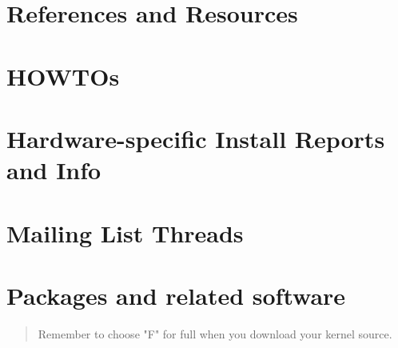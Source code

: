 \section{References and Resources}\label{bibliography}

\section{HOWTOs}\label{ref-howto}

\href{URL}{}

\href{URL 2}{}

\section{Hardware-specific Install Reports and
Info}\label{ref-installreports}

\href{URL 3}{}

\href{URL 4}{}

\section{Mailing List Threads}\label{ref-mailinglist}

\href{URL 5}{}

\section{Packages and related software}\label{ref-software}

\href{http://www.kernel.org}{}

\begin{quote}
Remember to choose "F" for full when you download your kernel source.
\end{quote}
